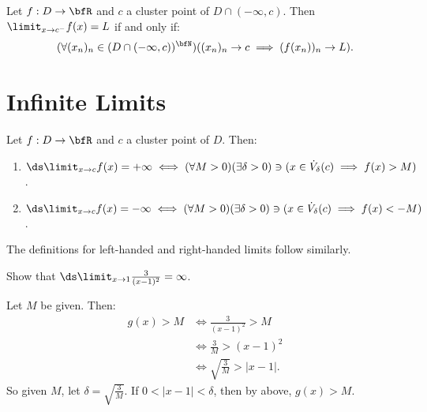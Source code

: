     \begin{proposition}
        Let $f:D \rightarrow \bfR$ and $c$ a cluster point of $D \cap (-\infty,c)$. Then $\limit_{x\rightarrow c^-}f(x) = L$ if and only if:
            \begin{equation*}
            \begin{split}
                (\forall (x_n)_n \in (D \cap (-\infty,c))^\bfN)((x_n)_n \rightarrow c \implies (f(x_n))_n \rightarrow L).
            \end{split}
            \end{equation*}
    \end{proposition}
\section{Infinite Limits}
    \begin{definition}
        Let $f:D \rightarrow \bfR$ and $c$ a cluster point of $D$. Then:
        \begin{enumerate}[label = (\arabic*)]
            \item $\ds \limit_{x \rightarrow c}f(x) = +\infty \iff (\forall M > 0)(\exists \delta > 0) \ni (x \in \dot{V}_\delta(c) \implies f(x) > M)$.
            \item $\ds \limit_{x \rightarrow c}f(x) = -\infty \iff (\forall M > 0)(\exists \delta > 0) \ni (x \in \dot{V}_\delta(c) \implies f(x) < -M)$.
        \end{enumerate}
    \end{definition}

    \begin{note}
        The definitions for left-handed and right-handed limits follow similarly.
    \end{note}

    \begin{example}
        Show that $\ds \limit_{x \rightarrow 1} \frac{3}{(x-1)^2} = \infty$.
    \end{example}
        \begin{solution}
            Let $M$ be given. Then:
                \begin{equation*}
                \begin{split}
                    g(x) > M 
                    &\iff \frac{3}{(x-1)^2} > M \\
                    &\iff \frac{3}{M} > (x-1)^2 \\
                    &\iff \sqrt{\frac{3}{M}} > |x-1|.
                \end{split}
                \end{equation*}
            So given $M$, let $\delta = \sqrt{\frac{3}{M}}$. If $0 < |x-1| < \delta$, then by above, $g(x) > M$.
        \end{solution}

